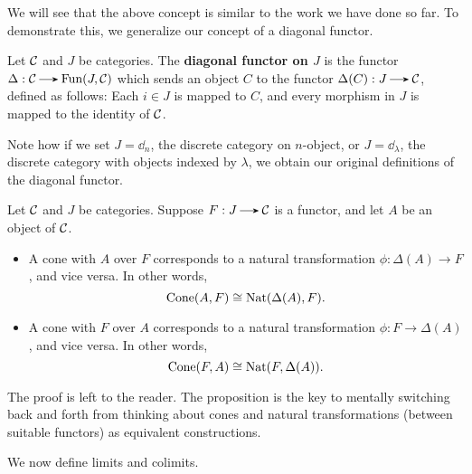     We will see that the above concept is similar to the work we have done so 
    far. To demonstrate this, we generalize our concept of a diagonal functor. 

    \begin{definition}
        Let $\mathcal{C}$ and $J$ be categories. The \textbf{diagonal functor on $J$}
        is the functor $\Delta: \cc \to \text{Fun}(J, \cc)$ which sends an object 
        $C$ to the functor $\Delta(C): J \to \cc$, defined as follows: Each $i \in J$ 
        is mapped to $C$, and every morphism in $J$ is mapped to the identity of $\mathcal{C}$. 
    \end{definition}

    Note how if we set $J = \dd_n$, the discrete category on $n$-object, or $J = \dd_{\lambda}$, 
    the discrete category with objects indexed by $\lambda$, we obtain our original definitions of the 
    diagonal functor. 

    \begin{proposition}\label{proposition:cones_are_natural_transformations}
        Let $\mathcal{C}$ and $J$ be categories. Suppose $F: J \to \cc$ is a functor, and let $A$ be an object of $\mathcal{C}$. 
        \begin{itemize}
            \item A cone with $A$ over $F$ corresponds to a natural transformation 
            $\phi: \Delta(A) \to F$, and vice versa. In other words, 
            \[
                \text{Cone}(A, F) \cong \operatorname{\mathrm{Nat}}(\Delta(A), F).
            \]
            \item A cone with $F$ over $A$ corresponds to a natural transformation 
            $\phi: F \to \Delta(A)$, and vice versa. In other words, 
            \[
                \text{Cone}(F,A) \cong \operatorname{\mathrm{Nat}}(F, \Delta(A)).
            \]
        \end{itemize}
    \end{proposition}

    The proof is left to the reader. The proposition is the key to mentally switching back and forth 
    from thinking about cones and natural transformations (between suitable functors) as equivalent constructions.

    We now define limits and colimits. 


